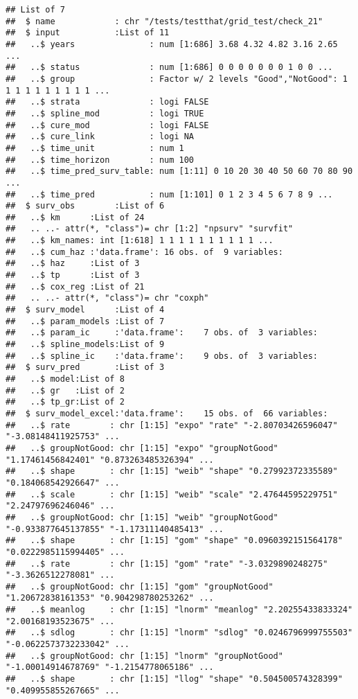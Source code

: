 \documentclass[
]{article}
\begin{document}
\begin{verbatim}
## List of 7
##  $ name            : chr "/tests/testthat/grid_test/check_21"
##  $ input           :List of 11
##   ..$ years               : num [1:686] 3.68 4.32 4.82 3.16 2.65 ...
##   ..$ status              : num [1:686] 0 0 0 0 0 0 0 1 0 0 ...
##   ..$ group               : Factor w/ 2 levels "Good","NotGood": 1 1 1 1 1 1 1 1 1 1 ...
##   ..$ strata              : logi FALSE
##   ..$ spline_mod          : logi TRUE
##   ..$ cure_mod            : logi FALSE
##   ..$ cure_link           : logi NA
##   ..$ time_unit           : num 1
##   ..$ time_horizon        : num 100
##   ..$ time_pred_surv_table: num [1:11] 0 10 20 30 40 50 60 70 80 90 ...
##   ..$ time_pred           : num [1:101] 0 1 2 3 4 5 6 7 8 9 ...
##  $ surv_obs        :List of 6
##   ..$ km      :List of 24
##   .. ..- attr(*, "class")= chr [1:2] "npsurv" "survfit"
##   ..$ km_names: int [1:618] 1 1 1 1 1 1 1 1 1 1 ...
##   ..$ cum_haz :'data.frame': 16 obs. of  9 variables:
##   ..$ haz     :List of 3
##   ..$ tp      :List of 3
##   ..$ cox_reg :List of 21
##   .. ..- attr(*, "class")= chr "coxph"
##  $ surv_model      :List of 4
##   ..$ param_models :List of 7
##   ..$ param_ic     :'data.frame':    7 obs. of  3 variables:
##   ..$ spline_models:List of 9
##   ..$ spline_ic    :'data.frame':    9 obs. of  3 variables:
##  $ surv_pred       :List of 3
##   ..$ model:List of 8
##   ..$ gr   :List of 2
##   ..$ tp_gr:List of 2
##  $ surv_model_excel:'data.frame':    15 obs. of  66 variables:
##   ..$ rate        : chr [1:15] "expo" "rate" "-2.80703426596047" "-3.08148411925753" ...
##   ..$ groupNotGood: chr [1:15] "expo" "groupNotGood" "1.17461456842401" "0.873263485326394" ...
##   ..$ shape       : chr [1:15] "weib" "shape" "0.27992372335589" "0.184068542926647" ...
##   ..$ scale       : chr [1:15] "weib" "scale" "2.47644595229751" "2.24797696246046" ...
##   ..$ groupNotGood: chr [1:15] "weib" "groupNotGood" "-0.933877645137855" "-1.17311140485413" ...
##   ..$ shape       : chr [1:15] "gom" "shape" "0.0960392151564178" "0.0222985115994405" ...
##   ..$ rate        : chr [1:15] "gom" "rate" "-3.0329890248275" "-3.3626512278081" ...
##   ..$ groupNotGood: chr [1:15] "gom" "groupNotGood" "1.20672838161353" "0.904298780253262" ...
##   ..$ meanlog     : chr [1:15] "lnorm" "meanlog" "2.20255433833324" "2.00168193523675" ...
##   ..$ sdlog       : chr [1:15] "lnorm" "sdlog" "0.0246796999755503" "-0.0622573732233042" ...
##   ..$ groupNotGood: chr [1:15] "lnorm" "groupNotGood" "-1.00014914678769" "-1.2154778065186" ...
##   ..$ shape       : chr [1:15] "llog" "shape" "0.504500574328399" "0.409955855267665" ...

\end{verbatim}
\end{document}
